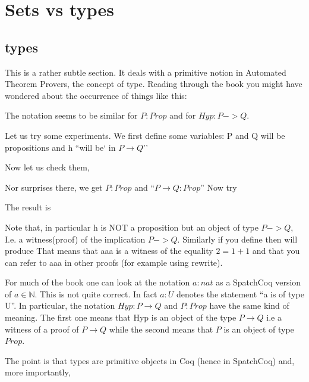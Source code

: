 \chapter{Sets vs types}\label{chap:setsvstypes}

\section{types}\label{sec:types}
This is a rather subtle section. It deals with a primitive notion in Automated Theorem Provers, the concept of type. Reading through the book you might have wondered about the occurrence of things like this:


The notation seems to be similar for $P:Prop$ and for $Hyp:P->Q$.

Let us try some experiments. We first define some variables: P and Q will be propositions and h ``will be` in $P\rightarrow Q$''


Now let us check them, 

Nor surprises there, we get $P:Prop$ and ``$P \rightarrow Q : Prop$''
Now try

The result is 
     
Note that, in particular h is NOT a proposition but an object of type $P->Q$, I.e. a witness(proof) of the implication $P->Q$. Similarly if you define 
then  will produce
That means that aaa is a witness of the equality $2=1+1$ and that you can refer to aaa in other proofs (for example using rewrite).


 For much of the book one can look at the notation $a:nat$ as a SpatchCoq version of $a\in \mathbb{N}$. This is not quite correct. In fact $a:U$ denotes the statement ``a is of type U''. In particular, the notation $Hyp:P\rightarrow Q$ and $P:Prop$ have the same kind of meaning. The first one means that Hyp is an object of the type $P\rightarrow Q$ i.e a witness of a proof of $P\rightarrow Q$ while the second means that $P$ is an object of type $Prop$.

The point is that types are primitive objects in Coq (hence in SpatchCoq) and, more importantly, 

